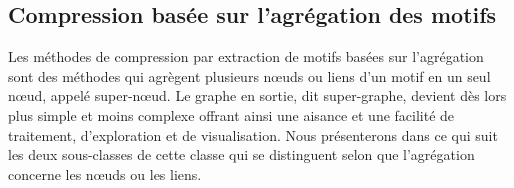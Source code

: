 \documentclass[a4paper,oneside,12pt]{report}
\theoremstyle{definition}
\begin{document}
							
							
					
				
				\subsection{Compression basée sur l'agrégation des motifs}
				
					Les méthodes de compression par extraction de motifs basées sur l'agrégation sont des méthodes   qui agrègent plusieurs nœuds ou liens d'un motif en un seul nœud, appelé super-nœud. Le graphe en sortie, dit super-graphe, devient dès lors plus simple et moins complexe offrant ainsi une aisance et une facilité de traitement, d'exploration et de visualisation. Nous présenterons dans ce qui suit les deux sous-classes de cette classe qui se distinguent selon que l'agrégation concerne les nœuds ou les liens.
					
\end{document}
